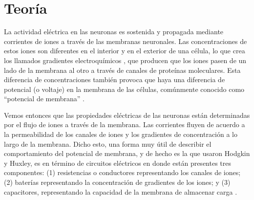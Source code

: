 \documentclass[aps,twocolumn,groupedaddress]{revtex4-2}
\begin{document}
\section{Teoría}
La actividad eléctrica en las neuronas es sostenida y propagada mediante corrientes de iones a través de las membranas neuronales. Las concentraciones de estos iones son diferentes en el interior y en el exterior de una célula, lo que crea los llamados gradientes electroquímicos \cite{izhikevich2007dynamical}, que producen que los iones pasen de un lado de la membrana al otro a través de canales de proteínas moleculares. Esta diferencia de concentraciones también provoca que haya una diferencia de potencial (o voltaje) en la membrana de las células, comúnmente conocido como “potencial de membrana” \cite{ermentrout2010mathematical}.

Vemos entonces que las propiedades eléctricas de las neuronas están determinadas por el flujo de iones a través de la membrana. Las corrientes fluyen de acuerdo a la permeabilidad de los canales de iones y los gradientes de concentración a lo largo de la membrana. Dicho esto, una forma muy útil de describir el comportamiento del potencial de membrana, y de hecho es la que usaron Hodgkin y Huxley, es en término de circuitos eléctricos en donde están presentes tres componentes: (1) resistencias o conductores representando los canales de iones; (2) baterías representando la concentración de gradientes de los iones; y (3) capacitores, representando la capacidad de la membrana de almacenar carga \cite{ermentrout2010mathematical}.
\end{document}
